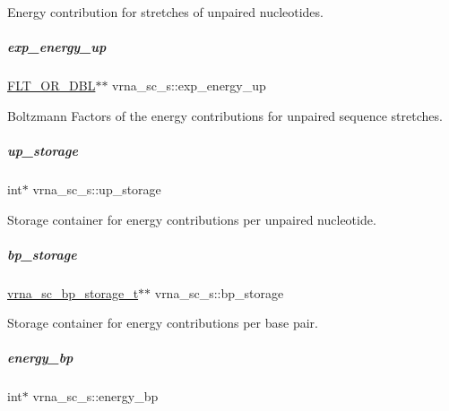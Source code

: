 Energy contribution for stretches of unpaired nucleotides. 

\mbox{\label{group__soft__constraints_ad3b4972d3b6c23865587e4ac56a37375}} 
\subparagraph{\texorpdfstring{exp\+\_\+energy\+\_\+up}{exp\_energy\_up}}
{\footnotesize\ttfamily \mbox{\hyperlink{group__data__structures_ga31125aeace516926bf7f251f759b6126}{F\+L\+T\+\_\+\+O\+R\+\_\+\+D\+BL}}$\ast$$\ast$ vrna\+\_\+sc\+\_\+s\+::exp\+\_\+energy\+\_\+up}



Boltzmann Factors of the energy contributions for unpaired sequence stretches. 

\mbox{\label{group__soft__constraints_a16c564d3170b7357620860de1e5faed6}} 
\subparagraph{\texorpdfstring{up\+\_\+storage}{up\_storage}}
{\footnotesize\ttfamily int$\ast$ vrna\+\_\+sc\+\_\+s\+::up\+\_\+storage}



Storage container for energy contributions per unpaired nucleotide. 

\mbox{\label{group__soft__constraints_a8e261e29462f6bdba3259e5eb61e48e8}} 
\subparagraph{\texorpdfstring{bp\+\_\+storage}{bp\_storage}}
{\footnotesize\ttfamily \mbox{\hyperlink{structvrna__sc__bp__storage__t}{vrna\+\_\+sc\+\_\+bp\+\_\+storage\+\_\+t}}$\ast$$\ast$ vrna\+\_\+sc\+\_\+s\+::bp\+\_\+storage}



Storage container for energy contributions per base pair. 

\mbox{\label{group__soft__constraints_ad139b8e06632e00cbcf3909815d0d03d}} 
\subparagraph{\texorpdfstring{energy\+\_\+bp}{energy\_bp}}
{\footnotesize\ttfamily int$\ast$ vrna\+\_\+sc\+\_\+s\+::energy\+\_\+bp}



